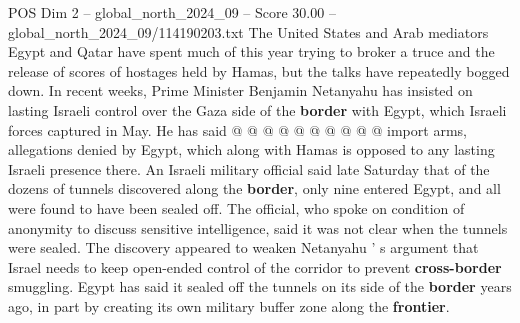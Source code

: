 \begin{textsample}{POS Dim 2 – global\_north\_2024\_09 – Score 30.00 – global\_north\_2024\_09/114190203.txt}
The United States and Arab mediators Egypt and Qatar have spent much of this year trying to broker a truce and the release of scores of hostages held by Hamas, but the talks have repeatedly bogged down.
In recent weeks, Prime Minister Benjamin Netanyahu has insisted on lasting Israeli control over the Gaza side of the \textbf{border} with Egypt, which Israeli forces captured in May.
He has said @ @ @ @ @ @ @ @ @ @ import arms, allegations denied by Egypt, which along with Hamas is opposed to any lasting Israeli presence there.
An Israeli military official said late Saturday that of the dozens of tunnels discovered along the \textbf{border}, only nine entered Egypt, and all were found to have been sealed off.
The official, who spoke on condition of anonymity to discuss sensitive intelligence, said it was not clear when the tunnels were sealed.
The discovery appeared to weaken Netanyahu ' s argument that Israel needs to keep open-ended control of the corridor to prevent \textbf{cross-border} smuggling.
Egypt has said it sealed off the tunnels on its side of the \textbf{border} years ago, in part by creating its own military buffer zone along the \textbf{frontier}.

\end{textsample}
